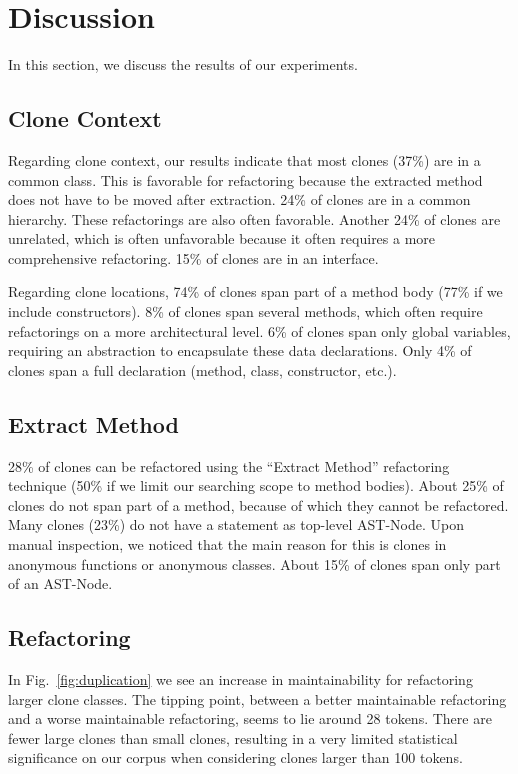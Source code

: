 \documentclass[sigconf,review, table]{acmart}
\begin{document}
\section{Discussion}
In this section, we discuss the results of our experiments.

\subsection{Clone Context}
Regarding clone context, our results indicate that most clones (37\%) are in a common class. This is favorable for refactoring because the extracted method does not have to be moved after extraction. 24\% of clones are in a common hierarchy. These refactorings are also often favorable. Another 24\% of clones are unrelated, which is often unfavorable because it often requires a more comprehensive refactoring. 15\% of clones are in an interface.

Regarding clone locations, 74\% of clones span part of a method body (77\% if we include constructors). 8\% of clones span several methods, which often require refactorings on a more architectural level. 6\% of clones span only global variables, requiring an abstraction to encapsulate these data declarations. Only 4\% of clones span a full declaration (method, class, constructor, etc.).

\subsection{Extract Method}
28\% of clones can be refactored using the ``Extract Method'' refactoring technique (50\% if we limit our searching scope to method bodies). About 25\% of clones do not span part of a method, because of which they cannot be refactored. Many clones (23\%) do not have a statement as top-level AST-Node. Upon manual inspection, we noticed that the main reason for this is clones in anonymous functions or anonymous classes. About 15\% of clones span only part of an AST-Node.

\subsection{Refactoring}
In Fig.~\ref{fig:duplication} we see an increase in maintainability for refactoring larger clone classes. The tipping point, between a better maintainable refactoring and a worse maintainable refactoring, seems to lie around 28 tokens. There are fewer large clones than small clones, resulting in a very limited statistical significance on our corpus when considering clones larger than 100 tokens.
\end{document}
